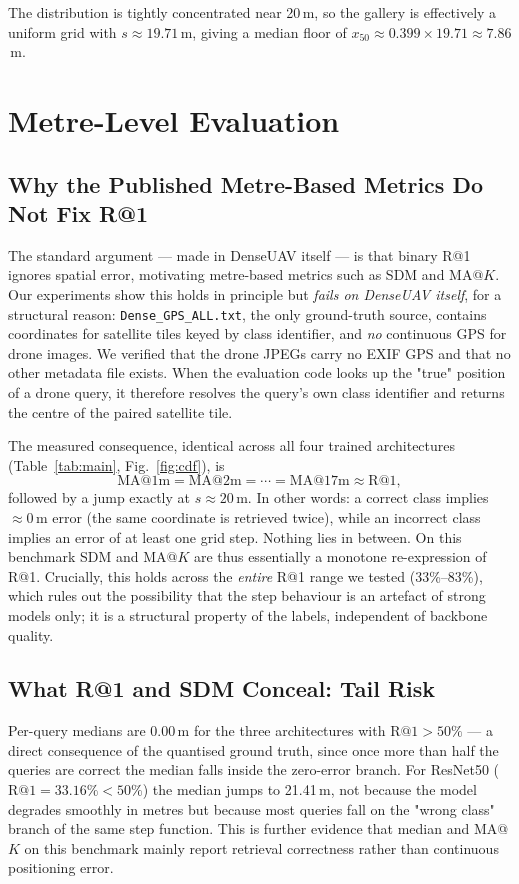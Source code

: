 \documentclass[journal]{IEEEtran}
\begin{document}
The distribution is tightly concentrated near 20\,m, so the gallery is effectively a
uniform grid with $s \approx 19.71$\,m, giving a median floor of
$x_{50} \approx 0.399 \times 19.71 \approx \mathbf{7.86}$\,m.

\section{Metre-Level Evaluation}
\label{sec:metric}

\subsection{Why the Published Metre-Based Metrics Do Not Fix R@1}
The standard argument --- made in DenseUAV itself --- is that binary R@1 ignores spatial
error, motivating metre-based metrics such as SDM and MA@$K$. Our experiments show this
holds in principle but \emph{fails on DenseUAV itself}, for a structural reason:
\texttt{Dense\_GPS\_ALL.txt}, the only ground-truth source, contains coordinates for
satellite tiles keyed by class identifier, and \emph{no} continuous GPS for drone images.
We verified that the drone JPEGs carry no EXIF GPS and that no other metadata file exists.
When the evaluation code looks up the "true" position of a drone query, it therefore
resolves the query's own class identifier and returns the centre of the paired satellite
tile.

The measured consequence, identical across all four trained architectures
(Table~\ref{tab:main}, Fig.~\ref{fig:cdf}), is
\begin{equation}
\text{MA@1m} = \text{MA@2m} = \cdots = \text{MA@17m} \approx \text{R@1},
\end{equation}
followed by a jump exactly at $s \approx 20$\,m. In other words: a correct class implies
$\approx 0$\,m error (the same coordinate is retrieved twice), while an incorrect class
implies an error of at least one grid step. Nothing lies in between. On this benchmark
SDM and MA@$K$ are thus essentially a monotone re-expression of R@1. Crucially, this
holds across the \emph{entire} R@1 range we tested (33\%--83\%), which rules out the
possibility that the step behaviour is an artefact of strong models only; it is a
structural property of the labels, independent of backbone quality.

\subsection{What R@1 and SDM Conceal: Tail Risk}
Per-query medians are $0.00$\,m for the three architectures with $\text{R@1}>50\%$ --- a
direct consequence of the quantised ground truth, since once more than half the queries
are correct the median falls inside the zero-error branch. For ResNet50
($\text{R@1}=33.16\%<50\%$) the median jumps to 21.41\,m, not because the model degrades
smoothly in metres but because most queries fall on the "wrong class" branch of the same
step function. This is further evidence that median and MA@$K$ on this benchmark mainly
report retrieval correctness rather than continuous positioning error.
\end{document}
